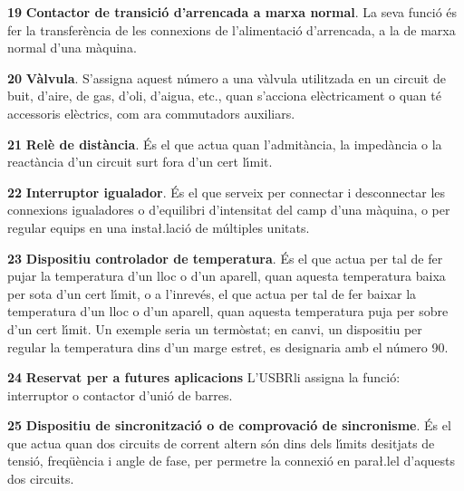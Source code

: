 \begin{multicols}{2}
\begin{list}{}
\item[\textbf{19}] 
\textbf{Contactor de transici\'{o} d'arrencada a marxa normal}. La seva
funci\'{o} \'{e}s fer la transfer\`{e}ncia de les connexions de l'alimentaci\'{o}
d'arrencada, a la de marxa normal d'una m\`{a}quina.

\item[\textbf{20}]  \textbf{V\`{a}lvula}. S'assigna aquest n\'{u}mero a una v\`{a}lvula
utilitzada en un circuit de buit, d'aire, de gas, d'oli, d'aigua,
etc., quan s'acciona el\`{e}ctricament o quan t\'{e} accessoris el\`{e}ctrics,
com ara commutadors auxiliars.

\item[\textbf{21}]  \textbf{Rel\`{e} de dist\`{a}ncia}. \'{E}s el que actua
quan l'admit\`{a}ncia, la imped\`{a}ncia o la react\`{a}ncia d'un circuit surt fora d'un cert l\'{\i}mit.

\item[\textbf{22}]  \textbf{Interruptor igualador}.  \'{E}s el
que serveix per connectar i desconnectar les connexions igualadores
o d'equilibri d'intensitat del camp d'una m\`{a}quina, o per regular
equips en una  insta{\l.l}aci\'{o} de  m\'{u}ltiples unitats.

\item[\textbf{23}]  \textbf{Dispositiu
controlador de temperatura}. \'{E}s el que actua per tal de fer pujar la
temperatura d'un lloc o d'un aparell, quan aquesta temperatura baixa
per sota d'un cert l\'{\i}mit, o a l'inrev\'{e}s, el que actua per tal de fer
 baixar la temperatura d'un lloc o d'un aparell, quan aquesta
temperatura  puja per sobre d'un cert l\'{\i}mit. Un exemple seria un
term\`{o}stat; en canvi, un dispositiu per regular la temperatura dins
d'un marge estret, es designaria amb el n\'{u}mero 90.

\item[\textbf{24}] \textbf{Reservat per a  futures aplicacions}
L'\textsf{USBR}\footnotemark[1] li assigna la funci\'{o}: interruptor o
contactor d'uni\'{o} de barres.

\item[\textbf{25}]  \textbf{Dispositiu de sincronitzaci\'{o} o de comprovaci\'{o}
de sincronisme}. \'{E}s el que actua quan dos circuits de corrent altern
s\'{o}n dins dels l\'{\i}mits desitjats de tensi\'{o}, freq\"{u}\`{e}ncia i angle de
fase, per permetre la connexi\'{o} en para{\l.l}el d'aquests dos circuits.



\end{list}
\end{multicols}
